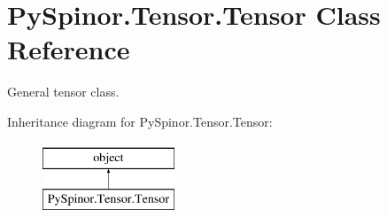 \hypertarget{class_py_spinor_1_1_tensor_1_1_tensor}{}\section{Py\+Spinor.\+Tensor.\+Tensor Class Reference}
\label{class_py_spinor_1_1_tensor_1_1_tensor}


General tensor class.  


Inheritance diagram for Py\+Spinor.\+Tensor.\+Tensor\+:\begin{figure}[H]
\begin{center}
\leavevmode
\includegraphics[height=2.000000cm]{class_py_spinor_1_1_tensor_1_1_tensor}
\end{center}
\end{figure}
